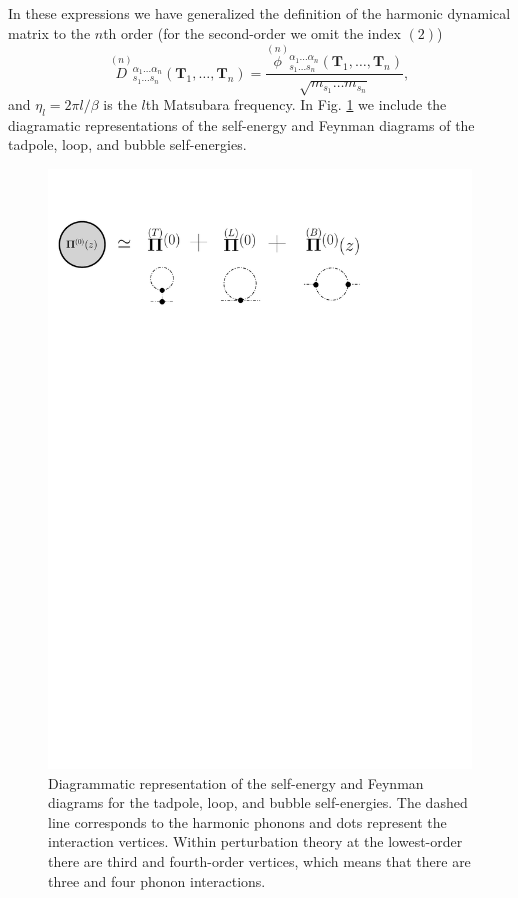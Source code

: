 In these expressions we have generalized the definition of the harmonic dynamical matrix to the $n$th order (for the second-order we omit the index $(2)$)
\begin{equation}
 \overset{(n)}{D}{}_{s_{1}\dots s_{n}}^{\alpha_{1}\dots\alpha_{n}}(\mathbf{T}_{1},\dots,\mathbf{T}_{n})=\frac{\overset{(n)}{\phi}{}_{s_{1}\dots s_{n}}^{\alpha_{1}\dots\alpha_{n}}(\mathbf{T}_{1},\dots,\mathbf{T}_{n})}{\sqrt{
 m_{s_{1}}\dots m_{s_{n}}}},
\end{equation}
and $\eta_{l}=2\pi l/\beta$ is the $l$th Matsubara frequency\cite{maradudin1962scattering}. In Fig. \ref{self-energy-fig} we include the diagramatic representations of the self-energy and Feynman diagrams of the 
tadpole, loop, and bubble self-energies.
\begin{figure}[h]
\begin{center}
\includegraphics[width=0.95\linewidth]{Figures/self-energy.pdf}
\caption[Diagramtic representation of the self-energy]{Diagrammatic representation of the self-energy and Feynman diagrams for the tadpole, loop, and bubble self-energies. The dashed line corresponds to the harmonic 
phonons and dots represent the interaction vertices. Within perturbation theory at the lowest-order there are third and fourth-order vertices, which means that there are three and four phonon interactions.}
\label{self-energy-fig}
\end{center}
\end{figure}
\\

